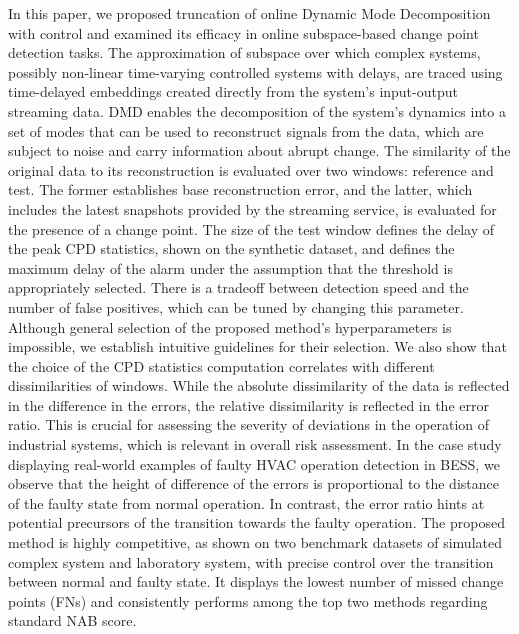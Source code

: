 In this paper, we proposed truncation of online Dynamic Mode Decomposition with control and examined its efficacy in online subspace-based change point detection tasks. The approximation of subspace over which complex systems, possibly non-linear time-varying controlled systems with delays, are traced using time-delayed embeddings created directly from the system's input-output streaming data. DMD enables the decomposition of the system's dynamics into a set of modes that can be used to reconstruct signals from the data, which are subject to noise and carry information about abrupt change. The similarity of the original data to its reconstruction is evaluated over two windows: reference and test. The former establishes base reconstruction error, and the latter, which includes the latest snapshots provided by the streaming service, is evaluated for the presence of a change point. The size of the test window defines the delay of the peak CPD statistics, shown on the synthetic dataset, and defines the maximum delay of the alarm under the assumption that the threshold is appropriately selected. There is a tradeoff between detection speed and the number of false positives, which can be tuned by changing this parameter. Although general selection of the proposed method's hyperparameters is impossible, we establish intuitive guidelines for their selection. We also show that the choice of the CPD statistics computation correlates with different dissimilarities of windows. While the absolute dissimilarity of the data is reflected in the difference in the errors, the relative dissimilarity is reflected in the error ratio. This is crucial for assessing the severity of deviations in the operation of industrial systems, which is relevant in overall risk assessment. In the case study displaying real-world examples of faulty HVAC operation detection in BESS, we observe that the height of difference of the errors is proportional to the distance of the faulty state from normal operation. In contrast, the error ratio hints at potential precursors of the transition towards the faulty operation. The proposed method is highly competitive, as shown on two benchmark datasets of simulated complex system and laboratory system, with precise control over the transition between normal and faulty state. It displays the lowest number of missed change points (FNs) and consistently performs among the top two methods regarding standard NAB score.
